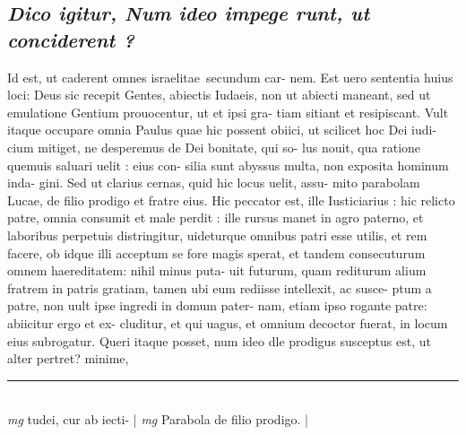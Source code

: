 \documentclass{article}
\begin{document}
\begin{pages}
\subsection*{\textit{Dico igitur, Num ideo impege runt, ut conciderent ? }}\pstart Id est, ut caderent omnes israelitae secundum car- nem. Est uero sententia huius loci: Deus sic recepit Gentes, abiectis Iudaeis, non ut abiecti maneant, sed ut emulatione Gentium prouocentur, ut et ipsi gra- tiam sitiant et resipiscant. Vult itaque occupare omnia Paulus quae hic possent obiici, ut scilicet hoc Dei iudi- cium mitiget, ne desperemus de Dei bonitate, qui so- lus nouit, qua ratione quemuis saluari uelit : eius con- silia sunt abyssus multa, non exposita hominum inda- gini. Sed ut clarius cernas, quid hic locus uelit, assu- mito parabolam Lucae, de filio prodigo et fratre eius. Hic peccator est, ille Iusticiarius : hic relicto patre, omnia consumit et male perdit : ille rursus manet in agro paterno, et laboribus perpetuis distringitur, uideturque omnibus patri esse utilis, et rem facere, ob idque illi acceptum se fore magis sperat, et tandem consecuturum omnem haereditatem: nihil minus puta- uit futurum, quam rediturum alium fratrem in patris gratiam, tamen ubi eum rediisse intellexit, ac susce- ptum a patre, non uult ipse ingredi in domum pater- nam, etiam ipso rogante patre: abiicitur ergo et ex- cluditur, et qui uagus, et omnium decoctor fuerat, in locum eius subrogatur. Queri itaque posset, num ideo dle prodigus susceptus est, ut alter pertret? minime,  \pend
\vspace{0.5cm}\noindent
\vspace{0.2cm}\rule{1cm}{0.2pt}\\ 
\hspace{0.2cm}\textit{mg}
\footnotesize tudei, cur ab iecti- 
\normalsize| 
\hspace{0.2cm}\textit{mg}
\footnotesize Parabola de filio prodigo. 
\normalsize| 

\end{pages}
\end{document}
